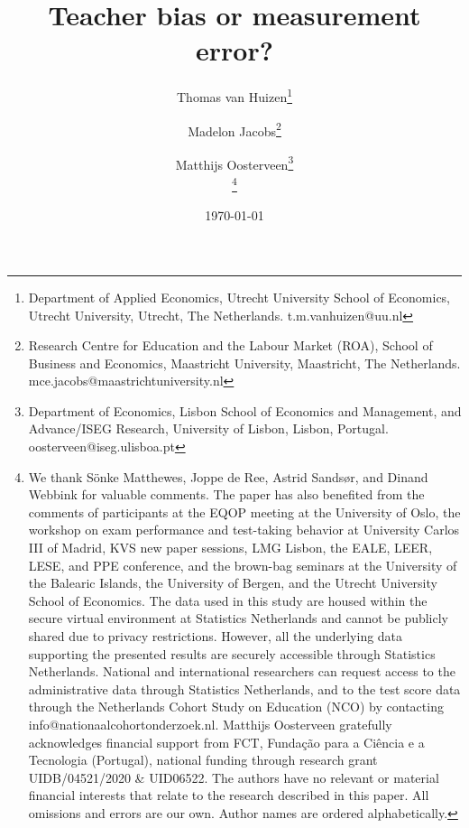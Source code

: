\documentclass[12pt,a4paper,oneside]{article}
\newcommand\blfootnote[1]{
  \begingroup
  \renewcommand\thefootnote{}\footnote{#1}
  \addtocounter{footnote}{-1}
  \endgroup
}
\begin{document}
\title{Teacher bias or measurement error?}
\author{Thomas van Huizen\thanks{Department of Applied Economics, Utrecht University School of Economics, Utrecht University, Utrecht, The Netherlands. t.m.vanhuizen@uu.nl} \and 
Madelon Jacobs\thanks{Research Centre for Education and the Labour Market (ROA), School of Business and Economics, Maastricht University, Maastricht, The Netherlands. mce.jacobs@maastrichtuniversity.nl} \and 
Matthijs Oosterveen\thanks{Department of Economics, Lisbon School of Economics and Management, and Advance/ISEG Research, University of Lisbon, Lisbon, Portugal. oosterveen@iseg.ulisboa.pt}
%
\blfootnote{
We thank S{\"o}nke Matthewes, Joppe de Ree, Astrid Sands{\o}r, and Dinand Webbink for valuable comments. The paper has also benefited from the comments of participants at the EQOP meeting at the University of Oslo, the workshop on exam performance and test-taking behavior at University Carlos III of Madrid, KVS new paper sessions,  LMG Lisbon, the EALE, LEER,  LESE, and PPE conference, and the brown-bag seminars at the University of the Balearic Islands, the University of Bergen, and the Utrecht University School of Economics. 
%
The data used in this study are housed within the secure virtual environment at Statistics Netherlands and cannot be publicly shared due to privacy restrictions. However, all the underlying data supporting the presented results are securely accessible through Statistics Netherlands. National and international researchers can request access to the administrative data through Statistics Netherlands, and to the test score data through the Netherlands Cohort Study on Education (NCO) by contacting info@nationaalcohortonderzoek.nl.
%
Matthijs Oosterveen gratefully acknowledges financial support from FCT,  Fundação para a Ciência e a Tecnologia (Portugal), national funding through research grant UIDB/04521/2020 \& UID06522.
%
The authors have no relevant or material financial interests that relate to the research described in this paper. All omissions and errors are our own. Author names are ordered alphabetically.
}}
\date{\today \\ \vspace{0.2in}}

\maketitle
\thispagestyle{empty}
\end{document}
